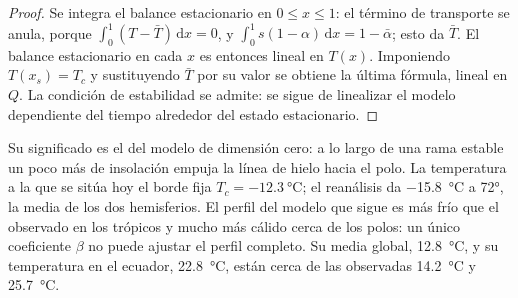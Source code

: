 \begin{proof}
Se integra el balance estacionario en $0 \le x \le 1$: el término de transporte
se anula, porque $\int_0^1(T - \bar T)\,\mathrm dx = 0$, y $\int_0^1
s(1 - \alpha)\,\mathrm dx = 1 - \bar\alpha$; esto da $\bar T$. El balance
estacionario en cada $x$ es entonces lineal en $T(x)$. Imponiendo $T(x_s) = T_c$
y sustituyendo $\bar T$ por su valor se obtiene la última fórmula, lineal en $Q$.
La condición de estabilidad se admite: se sigue de linealizar el
modelo dependiente del tiempo alrededor del estado estacionario.
\end{proof}

Su significado es el del modelo de dimensión cero: a lo largo de una rama estable
un poco más de insolación empuja la línea de hielo hacia el polo. La temperatura a
la que se sitúa hoy el borde fija $T_c = \qty{-12.3}{\celsius}$; el
reanálisis da \qty{-15.8}{\celsius} a \ang{72}, la media de los dos
hemisferios. El perfil del modelo que sigue es más frío que el observado en los
trópicos y mucho más cálido cerca de los polos: un único coeficiente $\beta$ no
puede ajustar el perfil completo. Su media global,
\qty{12.8}{\celsius}, y su temperatura en el ecuador, \qty{22.8}{\celsius}, están cerca de
las observadas \qty{14.2}{\celsius} y \qty{25.7}{\celsius}.

